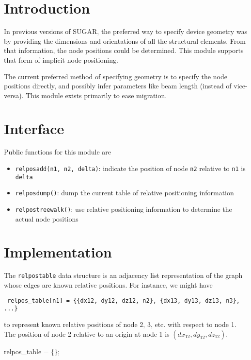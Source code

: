 
\section{Introduction}

In previous versions of SUGAR, the preferred way to specify device 
geometry was by providing the dimensions and orientations of all 
the structural elements.  From that information, the node positions 
could be determined.  This module supports that form of 
implicit node positioning.

The current preferred method of specifying geometry is to specify
the node positions directly, and possibly infer parameters like beam
length (instead of vice-versa).  This module exists primarily to
ease migration.


\section{Interface}

Public functions for this module are
\begin{itemize}
  \item {\tt{}relpos{}add(n1,\ n2,\ delta)}:
        indicate the position of node {\tt{}n2} relative to {\tt{}n1}
        is {\tt{}delta}
  \item {\tt{}relpos{}dump()}:
        dump the current table of relative positioning information
  \item {\tt{}relpos{}treewalk()}:
        use relative positioning information to determine the
        actual node positions
\end{itemize}


\section{Implementation}

The {\tt{}relpos{}table} data structure is an adjacency list
representation of the graph whose edges are known relative
positions.  For instance, we might have
\begin{verbatim}
 relpos_table[n1] = {{dx12, dy12, dz12, n2}, {dx13, dy13, dz13, n3}, ...}
\end{verbatim}
to represent known relative positions of node 2, 3, etc. with respect
to node 1.  The position of node 2 relative to an origin at node 1 is
$(dx_{12}, dy_{12}, dz_{12})$.

\endmoddef
relpos_table = \{\};

